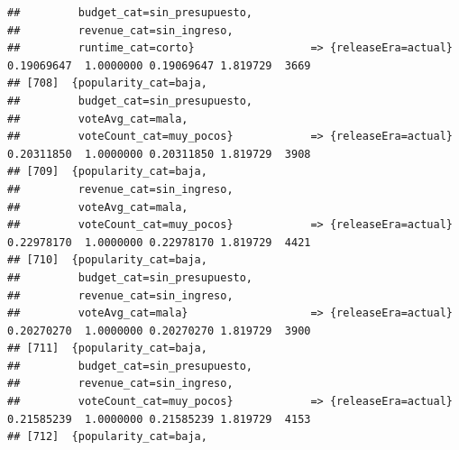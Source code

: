 \documentclass[
]{article}
\begin{document}
\begin{verbatim}
##         budget_cat=sin_presupuesto,                                                                                             
##         revenue_cat=sin_ingreso,                                                                                                
##         runtime_cat=corto}                  => {releaseEra=actual}               0.19069647  1.0000000 0.19069647 1.819729  3669
## [708]  {popularity_cat=baja,                                                                                                    
##         budget_cat=sin_presupuesto,                                                                                             
##         voteAvg_cat=mala,                                                                                                       
##         voteCount_cat=muy_pocos}            => {releaseEra=actual}               0.20311850  1.0000000 0.20311850 1.819729  3908
## [709]  {popularity_cat=baja,                                                                                                    
##         revenue_cat=sin_ingreso,                                                                                                
##         voteAvg_cat=mala,                                                                                                       
##         voteCount_cat=muy_pocos}            => {releaseEra=actual}               0.22978170  1.0000000 0.22978170 1.819729  4421
## [710]  {popularity_cat=baja,                                                                                                    
##         budget_cat=sin_presupuesto,                                                                                             
##         revenue_cat=sin_ingreso,                                                                                                
##         voteAvg_cat=mala}                   => {releaseEra=actual}               0.20270270  1.0000000 0.20270270 1.819729  3900
## [711]  {popularity_cat=baja,                                                                                                    
##         budget_cat=sin_presupuesto,                                                                                             
##         revenue_cat=sin_ingreso,                                                                                                
##         voteCount_cat=muy_pocos}            => {releaseEra=actual}               0.21585239  1.0000000 0.21585239 1.819729  4153
## [712]  {popularity_cat=baja,                                                                                                    

\end{verbatim}
\end{document}
